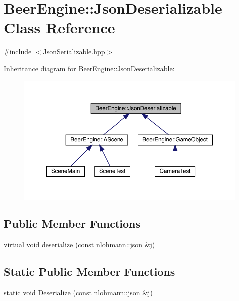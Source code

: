\hypertarget{class_beer_engine_1_1_json_deserializable}{}\section{Beer\+Engine\+:\+:Json\+Deserializable Class Reference}
\label{class_beer_engine_1_1_json_deserializable}


{\ttfamily \#include $<$Json\+Serializable.\+hpp$>$}



Inheritance diagram for Beer\+Engine\+:\+:Json\+Deserializable\+:
\nopagebreak
\begin{figure}[H]
\begin{center}
\leavevmode
\includegraphics[width=350pt]{class_beer_engine_1_1_json_deserializable__inherit__graph}
\end{center}
\end{figure}
\subsection*{Public Member Functions}
\begin{DoxyCompactItemize}
\item 
virtual void \mbox{\hyperlink{class_beer_engine_1_1_json_deserializable_ae1ce96bc441e544e7339641d80925726}{deserialize}} (const nlohmann\+::json \&j)
\end{DoxyCompactItemize}
\subsection*{Static Public Member Functions}
\begin{DoxyCompactItemize}
\item 
static void \mbox{\hyperlink{class_beer_engine_1_1_json_deserializable_af4c5582f75eb96988c5d4ff546218e1e}{Deserialize}} (const nlohmann\+::json \&j)
\end{DoxyCompactItemize}


